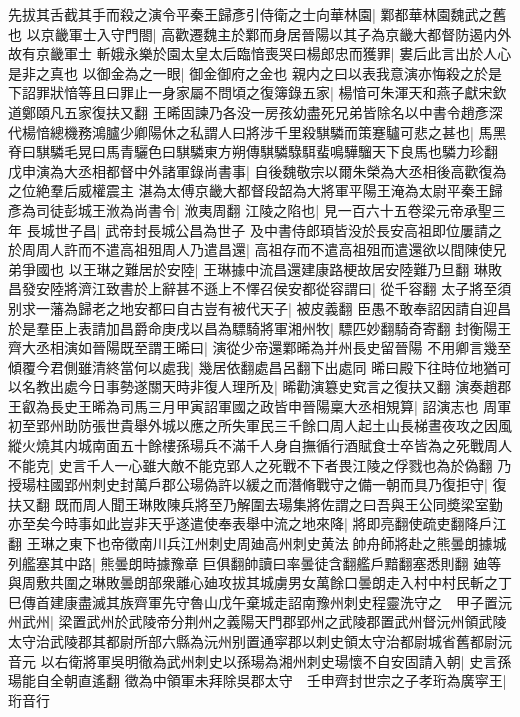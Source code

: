 先拔其舌截其手而殺之演令平秦王歸彥引侍衛之士向華林園|{
	鄴都華林園魏武之舊也}
以京畿軍士入守門閤|{
	高歡遷魏主於鄴而身居晉陽以其子為京畿大都督防遏内外故有京畿軍士}
斬娥永樂於園太皇太后臨愔喪哭曰楊郎忠而獲罪|{
	婁后此言出於人心是非之真也}
以御金為之一眼|{
	御金御府之金也}
親内之曰以表我意演亦悔殺之於是下詔罪狀愔等且曰罪止一身家屬不問頃之復簿錄五家|{
	楊愔可朱渾天和燕子獻宋欽道鄭頤凡五家復扶又翻}
王晞固諫乃各没一房孩幼盡死兄弟皆除名以中書令趙彥深代楊愔總機務鴻臚少卿陽休之私謂人曰將涉千里殺騏驎而策蹇驢可悲之甚也|{
	馬黑脊曰騏驎毛晃曰馬青驪色曰騏驎東方朔傳騏驎騄駬蜚鳴驊騮天下良馬也驎力珍翻}
戊申演為大丞相都督中外諸軍錄尚書事|{
	自後魏敬宗以爾朱榮為大丞相後高歡復為之位絶羣后威權震主}
湛為太傅京畿大都督段韶為大將軍平陽王淹為太尉平秦王歸彥為司徒彭城王浟為尚書令|{
	浟夷周翻}
江陵之陷也|{
	見一百六十五卷梁元帝承聖三年}
長城世子昌|{
	武帝封長城公昌為世子}
及中書侍郎頊皆没於長安高祖即位屢請之於周周人許而不遣高祖殂周人乃遣昌還|{
	高祖存而不遣高祖殂而遣還欲以間陳使兄弟爭國也}
以王琳之難居於安陸|{
	王琳據中流昌還建康路梗故居安陸難乃旦翻}
琳敗昌發安陸將濟江致書於上辭甚不遜上不懌召侯安都從容謂曰|{
	從千容翻}
太子將至須别求一藩為歸老之地安都曰自古豈有被代天子|{
	被皮義翻}
臣愚不敢奉詔因請自迎昌於是羣臣上表請加昌爵命庚戌以昌為驃騎將軍湘州牧|{
	驃匹妙翻騎奇寄翻}
封衡陽王　齊大丞相演如晉陽既至謂王晞曰|{
	演從少帝還鄴晞為并州長史留晉陽}
不用卿言幾至傾覆今君側雖清終當何以處我|{
	幾居依翻處昌呂翻下出處同}
晞曰殿下往時位地猶可以名教出處今日事勢遂關天時非復人理所及|{
	晞勸演簒史䆒言之復扶又翻}
演奏趙郡王叡為長史王晞為司馬三月甲寅詔軍國之政皆申晉陽稟大丞相䂓算|{
	詔演志也}
周軍初至郢州助防張世貴舉外城以應之所失軍民三千餘口周人起土山長梯晝夜攻之因風縱火燒其内城南面五十餘樓孫瑒兵不滿千人身自撫循行酒賦食士卒皆為之死戰周人不能克|{
	史言千人一心雖大敵不能克郢人之死戰不下者畏江陵之俘戮也為於偽翻}
乃授瑒柱國郢州刺史封萬戶郡公瑒偽許以緩之而潛脩戰守之備一朝而具乃復拒守|{
	復扶又翻}
既而周人聞王琳敗陳兵將至乃解圍去瑒集將佐謂之曰吾與王公同奬梁室勤亦至矣今時事如此豈非天乎遂遣使奉表舉中流之地來降|{
	將即亮翻使疏吏翻降戶江翻}
王琳之東下也帝徵南川兵江州刺史周廸高州刺史黄法帥舟師將赴之熊曇朗據城列艦塞其中路|{
	熊曇朗時據豫章巨俱翻帥讀曰率曇徒含翻艦戶黯翻塞悉則翻}
廸等與周敷共圍之琳敗曇朗部衆離心廸攻拔其城虜男女萬餘口曇朗走入村中村民斬之丁巳傳首建康盡滅其族齊軍先守魯山戊午棄城走詔南豫州刺史程靈洗守之　甲子置沅州武州|{
	梁置武州於武陵帝分荆州之義陽天門郡郢州之武陵郡置武州督沅州領武陵太守治武陵郡其都尉所部六縣為沅州别置通寜郡以刺史領太守治都尉城省舊都尉沅音元}
以右衛將軍吳明徹為武州刺史以孫瑒為湘州刺史瑒懷不自安固請入朝|{
	史言孫瑒能自全朝直遙翻}
徵為中領軍未拜除吳郡太守　壬申齊封世宗之子孝珩為廣寜王|{
	珩音行}
